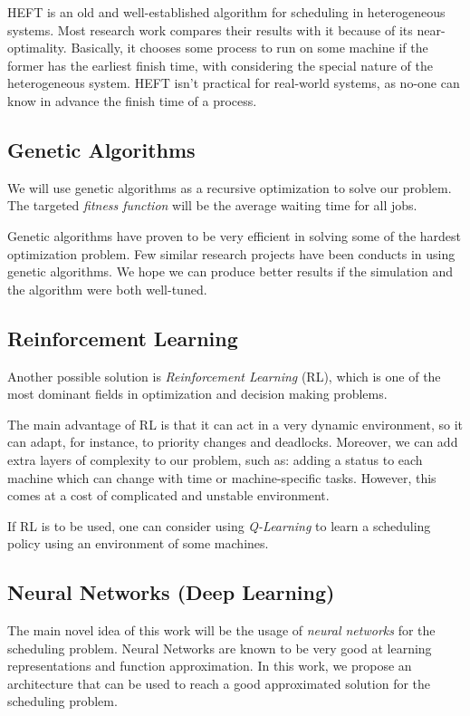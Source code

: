 \documentclass[twocolumn,11pt]{IEEEtran}
\begin{document}
    HEFT is an old and well-established algorithm for scheduling in heterogeneous systems. Most research work compares their results with it because of its near-optimality. Basically, it chooses some process to run on some machine if the former has the earliest finish time, with considering the special nature of the heterogeneous system. HEFT isn't practical for real-world systems, as no-one can know in advance the finish time of a process.
    
    \subsection{Genetic Algorithms}
    We will use genetic algorithms as a recursive optimization to solve our problem. The targeted \emph{fitness function} will be the average waiting time for all jobs. 
    
    Genetic algorithms have proven to be very efficient in solving some of the hardest optimization problem. Few similar research projects have been conducts in using genetic algorithms. We hope we can produce better results if the simulation and the algorithm were both well-tuned.

    \subsection{Reinforcement Learning}
    Another possible solution is \emph{Reinforcement Learning} (RL), which is one of the most dominant fields in optimization and decision making problems. 
    
    The main advantage of RL is that it can act in a very dynamic environment, so it can adapt, for instance, to priority changes and deadlocks. Moreover, we can add extra layers of complexity to our problem, such as: adding a status to each machine which can change with time or machine-specific tasks. However, this comes at a cost of complicated and unstable environment.

    If RL is to be used, one can consider using \emph{Q-Learning} to learn a scheduling policy using an environment of some machines. 
    
    \subsection{Neural Networks (Deep Learning)}
    The main novel idea of this work will be the usage of \emph{neural networks} for the scheduling problem. Neural Networks are known to be very good at learning representations and function approximation. In this work, we propose an architecture that can be used to reach a good approximated solution for the scheduling problem.
    
\end{document}
